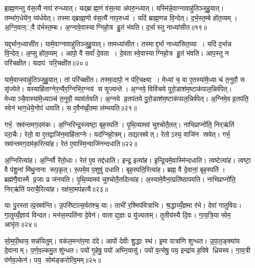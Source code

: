 ब्रा॒ह्म॒णन्तु व॑स॒त्यै॑ नाप॑ रुन्ध्यात्। यद्ब्राह्म॒णं व॑स॒त्या अ॑परु॒न्ध्यात्। यस्मि॑न्ने॒वाग्नावाहु॑तिञ्जुहु॒यात्। तम्भा॑ग॒धेये॑न॒ व्य॑र्धयेत्। तस्माद्ब्राह्म॒णो व॑स॒त्यै॑ नाप॒रुध्य॑। यदि॑ ब्राह्म॒णन्न वि॒न्देत्। द॒र्भ॒स्त॒म्बे हो॑त॒व्यम्। अ॒ग्नि॒वाऩ््वै द॑र्भस्त॒म्बः। अ॒ग्नावे॒वास्याग्निहो॒त्र हु॒तं भ॑वति। द॒र्भास्तु नाध्या॑सीत॥१९॥

यद्द॒र्भान॒ध्यासी॑त। यामे॒वाग्नावाहु॑तिञ्जुहु॒यात्। तामध्या॑सीत। तस्माद्द॒र्भा नाध्या॑सित॒व्या। यदि॑ द॒र्भान्न वि॒न्देत्। अ॒प्सु हो॑त॒व्यम्। आपो॒ वै सर्वा॑ दे॒वता। दे॒वतास्वे॒वास्याग्निहो॒त्र हु॒तं भ॑वति। आप॒स्तु न परि॑चक्षीत। यदाप॑ परि॒चक्षी॑त॥२०॥

यामे॒वाप्स्वाहु॑तिञ्जुहु॒यात्। तां परि॑चक्षीत। तस्मा॒दापो॒ न प॑रि॒चक्ष्या। मेध्या॑ च॒ वा ए॒तस्या॑मे॒ध्या च॑ त॒नुवौ॒ स सृ॑ज्येते। यस्याहि॑ताग्नेर॒न्यैर॒ग्निभि॑र॒ग्नय॑ ससृ॒ज्यन्ते। अ॒ग्नये॒ विवि॑चये पुरो॒डाश॑म॒ष्टाक॑पाल॒न्निर्व॑पेत्। मेध्याञ्चै॒वास्या॑मे॒ध्याञ्च॑ त॒नुवौ॒ व्याव॑र्तयति। अ॒ग्नये व्र॒तप॑तये पु॒रो॒डाश॑म॒ष्टाक॑पाल॒न्निर्व॑पेत्। अ॒ग्निमे॒व व्र॒तप॑ति॒ स्वेन॑ भाग॒धेये॒नोप॑ धावति। स ए॒वैन॑व्व्रँ॒तमा ल॑म्भयति॥२१॥

गर्भ॒ स्रव॑न्तमग॒दम॑कः। अ॒ग्निरिन्द्र॒स्त्वष्टा॒ बृह॒स्पति॑। पृ॒थि॒व्यामव॑ चुश्चोतै॒तत्। नाभिप्राप्नो॑ति॒ निर्‌ऋ॑तिं परा॒चैः। रेतो॒ वा ए॒तद्वाजि॑न॒माहि॑ताग्नेः। यद॑ग्निहो॒त्रम्। तद्यत्स्रवेत्। रेतोऽस्य॒ वाजि॑न स्रवेत्। गर्भ॒ स्रव॑न्तमग॒दम॑क॒रित्या॑ह। रेत॑ ए॒वास्मि॒न्वाजि॑नन्दधाति॥२२॥

अ॒ग्निरित्या॑ह। अ॒ग्निर्वै रे॑तो॒धाः। रेत॑ ए॒व तद्द॑धाति। इन्द्र॒ इत्या॑ह। इ॒न्द्रि॒यमे॒वास्मि॑न्दधाति। त्वष्टेत्या॑ह। त्वष्टा॒ वै प॑शू॒नां मि॑थु॒नाना रूप॒कृत्। रू॒पमे॒व प॒शुषु॑ दधाति। बृह॒स्पति॒रित्या॑ह। ब्रह्म॒ वै दे॒वानां॒ बृह॒स्पति॑। ब्रह्म॑णै॒वास्मै प्र॒जाः प्र ज॑नयति। पृ॒थि॒व्यामव॑ चुश्चोतै॒तदित्या॑ह। अ॒स्यामे॒वैन॒त्प्रति॑ष्ठापयति। नाभिप्राप्नो॑ति॒ निर्‌ऋ॑तिं पराचै॒रित्या॑ह। रक्ष॑सा॒मप॑हत्यै॥२३॥

याः पु॒रस्तात्प्र॒स्रव॑न्ति। उ॒परि॑ष्टात्स॒र्वत॑श्च॒ याः। ताभी॑ र॒श्मिप॑वित्राभिः। श्र॒द्धाय्यँ॒ज्ञमा र॑भे। देवा॑ गातुविदः। गा॒तुय्यँ॒ज्ञाय॑ विन्दत। मन॑स॒स्पति॑ना दे॒वेन॑। वाताद्य॒ज्ञः प्र यु॑ज्यताम्। तृ॒तीय॑स्यै दि॒वः। गा॒य॒त्रि॒या सोम॒ आभृ॑तः॥२४॥

सो॒म॒पी॒थाय॒ सन्न॑यितुम्। वक॑ल॒मन्त॑र॒मा द॑दे। आपो॑ देवीः शु॒द्धाः स्थ॑। इ॒मा पात्रा॑णि शुन्धत। उ॒पा॒त॒ङ्क्या॑य दे॒वानाम्। प॒र्ण॒व॒ल्कमु॒त शु॑न्धत। पयो॑ गृ॒हेषु॒ पयो॑ अघ्नि॒यासु॑। पयो॑ व॒त्सेषु॒ पय॒ इन्द्रा॑य ह॒विषे ध्रियस्व। गा॒य॒त्री प॑र्णव॒ल्केन॑। पय॒ सोम॑ङ्करोत्वि॒मम्॥२५॥

